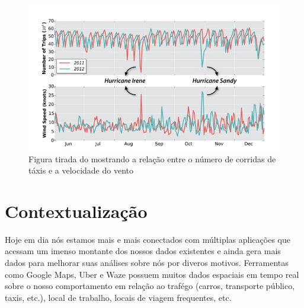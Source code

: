 \begin{figure}[t]
	\centering
	\includegraphics[width=\textwidth]{images/outlier-freire-figure-1}
	\caption{Figura tirada do \cite{DBLP:journals/debu/FreireCVZ16} mostrando a relação entre o número de corridas de táxis e a velocidade do vento}
	\label{fig:freire-paper-taxy-wind}
	\vspace{-10pt}
\end{figure}

\section{Contextualização}


Hoje em dia nós estamos mais e mais conectados com múltiplas aplicações que acessam um imenso montante dos nossos dados existentes e ainda gera mais dados para melhorar suas análises sobre nós por diveros motivos. Ferramentas como Google Maps, Uber e Waze possuem muitos dados espaciais em tempo real sobre o nosso comportamento em relação ao trafégo (carros, transporte público, taxis, etc.), local de trabalho, locais de viagem frequentes, etc.


